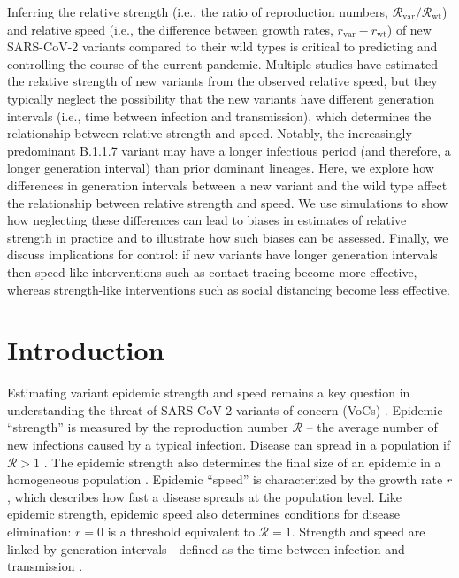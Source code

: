 \documentclass[12pt]{article}
\newcommand{\vvvar}{\mathrm{var}}
\newcommand{\wwwt}{\mathrm{wt}}
\newcommand{\rx}[1]{\ensuremath{{r}_{#1}}\xspace}
\newcommand{\rw}{\rx{\wwwt}}
\newcommand{\rv}{\rx{\vvvar}}
\newcommand{\Rx}[1]{\ensuremath{{\mathcal R}_{#1}}\xspace}
\newcommand{\RR}{\ensuremath{{\mathcal R}}\xspace}
\newcommand{\Rw}{\Rx{\wwwt}}
\newcommand{\Rv}{\Rx{\vvvar}}
\begin{document}
Inferring the relative strength (i.e., the ratio of reproduction numbers, $\Rv/\Rw$) and relative speed (i.e., the difference between growth rates, $\rv-\rw$) of new SARS-CoV-2 variants compared to their wild types is critical to predicting and controlling the course of the current pandemic.
Multiple studies have estimated the relative strength of new variants from the observed relative speed, but they typically neglect the possibility that the new variants have different generation intervals (i.e., time between infection and transmission), which determines the relationship between relative strength and speed.
Notably, the increasingly predominant B.1.1.7 variant may have a longer infectious period (and therefore, a longer generation interval) than prior dominant lineages.
Here, we explore how differences in generation intervals between a new variant and the wild type affect the relationship between relative strength and speed.
We use simulations to show how neglecting these differences can lead to biases in estimates of relative strength in practice and to illustrate how such biases can be assessed.
Finally, we discuss implications for control: if new variants have longer generation intervals then speed-like interventions such as contact tracing become more effective, whereas strength-like interventions such as social distancing become less effective.

\section{Introduction}

Estimating variant epidemic strength and speed remains a key question in understanding the threat of SARS-CoV-2 variants of concern (VoCs) \citep{switzerland2021variant, davies2021estimated, di2021impact,graham2021changes, leung2021early, volz2021transmission,zhao2021}.
Epidemic ``strength'' is measured by the reproduction number $\RR$ -- the average number of new infections caused by a typical infection. 
Disease can spread in a population if $\RR>1$ \citep{diekmann1990definition}.
The epidemic strength also determines the final size of an epidemic in a homogeneous population \citep{anderson1991infectious}.
Epidemic ``speed'' is characterized by the growth rate $r$, which describes how fast a disease spreads at the population level.
Like epidemic strength, epidemic speed also determines conditions for disease elimination: $r=0$ is a threshold equivalent to $\RR=1$.
Strength and speed are linked by generation intervals---defined as the time between infection and transmission \citep{roberts2007model,svensson2007note,wallinga2007generation}.
\end{document}
